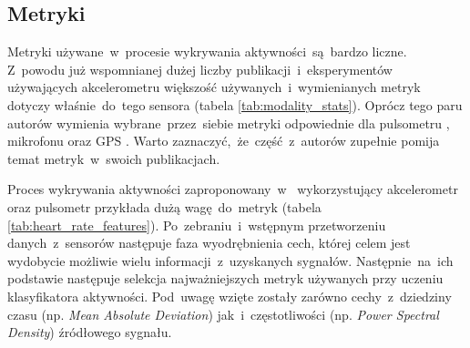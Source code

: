 \subsection{Metryki}
Metryki używane~w~procesie wykrywania aktywności~są~bardzo liczne. Z~powodu już wspomnianej dużej liczby publikacji~i~eksperymentów używających akcelerometru większość używanych~i~wymienianych metryk dotyczy właśnie~do~tego sensora (tabela \ref{tab:modality_stats}). Oprócz tego paru autorów wymienia wybrane~przez~siebie metryki odpowiednie dla pulsometru \cite{S04}, mikrofonu \cite{S22, S46} oraz GPS \cite{S26}. Warto zaznaczyć,~że~część~z~autorów zupełnie pomija temat metryk~w~swoich publikacjach.


Proces wykrywania aktywności zaproponowany~w~\cite{S04} wykorzystujący akcelerometr oraz pulsometr przykłada dużą wagę~do~metryk (tabela \ref{tab:heart_rate_features}). Po~zebraniu~i~wstępnym przetworzeniu danych~z~sensorów następuje faza wyodrębnienia cech, której celem jest wydobycie możliwie wielu informacji~z~uzyskanych sygnałów. Następnie~na~ich podstawie następuje selekcja najważniejszych metryk używanych przy uczeniu klasyfikatora aktywności. Pod~uwagę wzięte zostały zarówno cechy~z~dziedziny czasu (np. {\it Mean Absolute Deviation}) jak~i~częstotliwości (np. {\it Power Spectral Density}) źródłowego sygnału.


